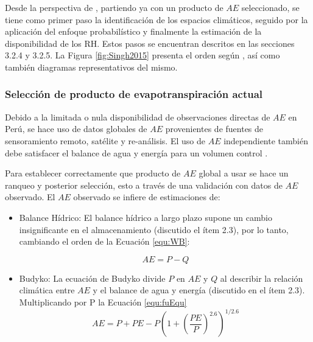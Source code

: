 \documentclass[12pt]{article}
\begin{document}
Desde la perspectiva de \citet{Singh2015}, partiendo ya con un producto de $AE$ seleccionado, se tiene como primer paso la identificación de los espacios climáticos, seguido por la aplicación del enfoque probabilístico y finalmente la estimación de la disponibilidad de los RH. Estos pasos se encuentran descritos en las secciones 3.2.4 y 3.2.5. La Figura \ref{fig:Singh2015} presenta el orden según \citet{Singh2015}, así como también diagramas representativos del mismo.





\subsubsection{Selección de producto de evapotranspiración actual}

Debido a la limitada o nula disponibilidad de observaciones directas de $AE$ en Perú, se hace uso de datos globales de $AE$ provenientes de fuentes de sensoramiento remoto, satélite y re-análisis. El uso de $AE$ independiente también debe satisfacer el balance de agua y energía para un volumen control \citep{Singh2015}.

Para establecer correctamente que producto de $AE$ global a usar se hace un ranqueo y posterior selección, esto a través de una validación con datos de $AE$ observado. El $AE$ observado se infiere de estimaciones de:

\begin{itemize}

	\item Balance Hídrico: El balance hídrico a largo plazo supone un cambio insignificante en el almacenamiento (discutido el ítem 2.3), por lo tanto, cambiando el orden de la Ecuación \ref{equ:WB}:
	
	\begin{equation}
    AE = P - Q
    \label{equ:bheq}
    \end{equation}

	\item Budyko: La ecuación de Budyko divide $P$ en $AE$ y $Q$ al describir la relación climática entre $AE$ y el balance de agua y energía (discutido en el ítem 2.3). Multiplicando por P la Ecuación \ref{equ:fuEqu}
    \begin{equation}
    AE = P + PE - P\left (1 + \left ( \frac{PE}{P} \right )^{2.6}  \right )^{1/2.6}
    \end{equation}
	
\end{itemize}
\end{document}
